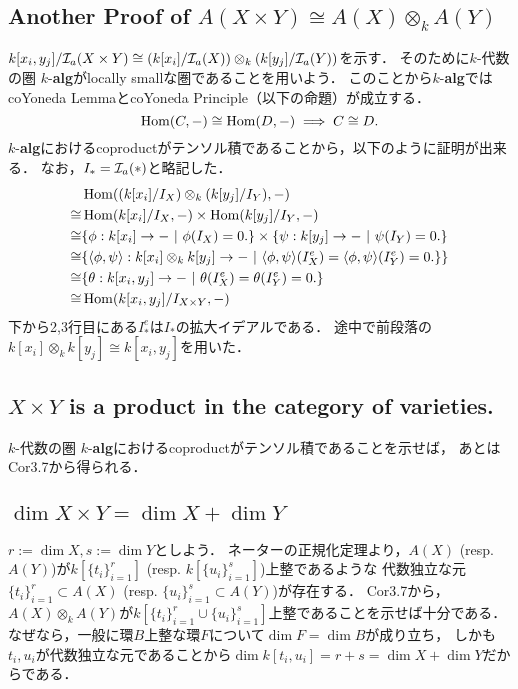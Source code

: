 \documentclass[a4paper]{jsarticle}
\begin{document}
    \subsection{Another Proof of $A(X \times Y) \cong A(X) \otimes_k A(Y)$}
    $k[x_i,y_j]/\mathcal{I}_a(X \times Y) \cong (k[x_i]/\mathcal{I}_a(X)) \otimes_k (k[y_j]/\mathcal{I}_a(Y))$を示す．
    そのために$k$-代数の圏 $k$-\textbf{alg}がlocally smallな圏であることを用いよう．
    このことから$k$-\textbf{alg}ではcoYoneda LemmaとcoYoneda Principle（以下の命題）が成立する．
    \[ \operatorname{Hom}(C,-) \cong \operatorname{Hom}(D,-) \implies C \cong D. \]
    $k$-\textbf{alg}におけるcoproductがテンソル積であることから，以下のように証明が出来る．
    なお，$I_*=\mathcal{I}_a(*)$と略記した．
    \begin{align*}
        {}&     \operatorname{Hom}((k[x_i]/I_{X}) \otimes_k (k[y_j]/I_{Y}),-) \\
        \cong&  \operatorname{Hom}(k[x_i]/I_{X},-) \times \operatorname{Hom}(k[y_j]/I_{Y},-) \\
        \cong&  \{\phi: k[x_i] \to - ~|~ \phi(I_{X})=0. \} \times \{\psi: k[y_j] \to - ~|~ \psi(I_{Y})=0. \} \\
        \cong&  \{\langle \phi,\psi \rangle: k[x_i] \otimes_k k[y_j] \to - ~|~ \langle \phi,\psi \rangle(I^e_{X})=\langle \phi,\psi \rangle(I^e_{Y})=0. \} \} \\
        \cong&  \{\theta: k[x_i,y_j] \to - ~|~ \theta(I^e_{X})=\theta(I^e_{Y})=0. \} \\
        \cong&  \operatorname{Hom}(k[x_i,y_j]/I_{X \times Y},-)
    \end{align*}
    下から2,3行目にある$I^e_*$は$I_*$の拡大イデアルである．
    途中で前段落の$k[x_i] \otimes_k k[y_j] \cong k[x_i,y_j]$を用いた．

    \subsection{$X \times Y$ is a product in the category of varieties.}
    $k$-代数の圏 $k$-\textbf{alg}におけるcoproductがテンソル積であることを示せば，
    あとはCor3.7から得られる．

    \subsection{$\dim X \times Y=\dim X+\dim Y$}
    $r:=\dim X, s:=\dim Y$としよう．
    ネーターの正規化定理より，$A(X)$ (resp. $A(Y)$)が$k[\{t_i\}_{i=1}^{r}]$ (resp. $k[\{u_i\}_{i=1}^{s}]$)上整であるような
    代数独立な元$\{t_i\}_{i=1}^{r} \subset A(X)$ (resp. $\{u_i\}_{i=1}^{s} \subset A(Y)$)が存在する．
    Cor3.7から，$A(X) \otimes_k A(Y)$が$k[\{t_i\}_{i=1}^{r} \cup \{u_i\}_{i=1}^{s}]$上整であることを示せば十分である．
    なぜなら，一般に環$B$上整な環$F$について$\dim F=\dim B$が成り立ち，
    しかも$t_i, u_i$が代数独立な元であることから$\dim k[t_i,u_i]=r+s=\dim X+\dim Y$だからである．
\end{document}
